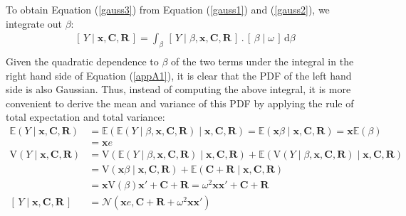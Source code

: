 \documentclass[12pt]{article}
\newcommand{\Esp}{\mathbb E}
\newcommand{\Var}{\textrm{V}}
\newcommand{\x}{\boldsymbol{x}}
\newcommand{\Om}{\boldsymbol{\Omega}}
\begin{document}
\begin{appendix}[A]
To obtain Equation (\ref{gauss3}) from Equation (\ref{gauss1}) and (\ref{gauss2}), we integrate out $\beta$:
\begin{equation} 
\label{appA1}
\begin{array}{ll}
\left[\,Y\mid \x,\mathbf{C}, \mathbf{R}\,\right] =  \int_\beta\,\left[\,Y\mid \beta,\x,\mathbf{C}, \mathbf{R}\,\right]\,.\,\left[\,\beta\mid\omega\,\right]\,\textrm{d}\beta\\
\end{array}
\end{equation}
Given the quadratic dependence to $\beta$ of the two terms under the integral in the right hand side of Equation (\ref{appA1}), it is clear that the PDF of the left hand side is also Gaussian. Thus, instead of computing the above integral, it is more convenient to derive the mean and variance of this PDF by applying the rule of total expectation and total variance:
\begin{equation} 
\label{appA2}
\begin{array}{ll}
\Esp(Y\mid \x,\mathbf{C}, \mathbf{R})&=\Esp\left(\Esp(Y\mid \beta, \x,\mathbf{C}, \mathbf{R})\mid \x,\mathbf{C}, \mathbf{R}\right)=\Esp\left(\x\beta\mid \x,\mathbf{C}, \mathbf{R}\right)=\x\Esp\left(\beta\right)\\
&=\x e\\
\Var(Y\mid \x,\mathbf{C}, \mathbf{R})&=\Var\left(\Esp(Y\mid \beta, \x,\mathbf{C}, \mathbf{R})\mid \x,\mathbf{C}, \mathbf{R}\right)+\Esp\left(\Var(Y\mid \beta, \x,\mathbf{C}, \mathbf{R})\mid \x,\mathbf{C}, \mathbf{R}\right)\\
&=\Var\left(\x\beta\mid \x,\mathbf{C}, \mathbf{R}\right)+\Esp\left(\mathbf C+\mathbf R\mid \x,\mathbf{C}, \mathbf{R}\right)\\
&=\x\Var(\beta)\x'+\mathbf C+\mathbf R=\omega^2\x\x'+\mathbf C+\mathbf R\\
\left[\,Y\mid \x,\mathbf{C}, \mathbf{R}\,\right]& =\mathcal{N}(\x e,\mathbf{C}+\mathbf{R}+\omega^2\x\x')\\
\end{array}
\end{equation}


\end{appendix}
\end{document}
